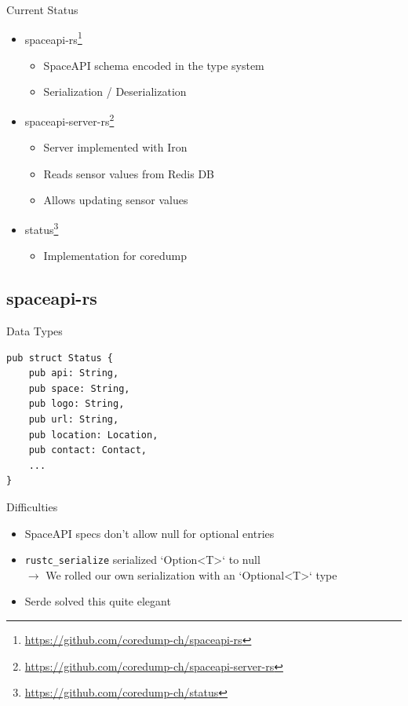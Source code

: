 \begin{frame}[c]{Current Status}
    \begin{itemize}
        \item spaceapi-rs\footnote{\url{https://github.com/coredump-ch/spaceapi-rs}}
            \begin{itemize}
                \item SpaceAPI schema encoded in the type system
                \item Serialization / Deserialization
            \end{itemize}
        \item spaceapi-server-rs\footnote{\url{https://github.com/coredump-ch/spaceapi-server-rs}}
            \begin{itemize}
                \item Server implemented with Iron
                \item Reads sensor values from Redis DB
                \item Allows updating sensor values
            \end{itemize}
        \item status\footnote{\url{https://github.com/coredump-ch/status}}
            \begin{itemize}
                \item Implementation for coredump
            \end{itemize}
    \end{itemize}
\end{frame}

\subsection{spaceapi-rs}

\begin{frame}[fragile]{Data Types}
    \begin{verbatim}
pub struct Status {
    pub api: String,
    pub space: String,
    pub logo: String,
    pub url: String,
    pub location: Location,
    pub contact: Contact,
    ...
}
    \end{verbatim}
\end{frame}

\begin{frame}[c]{Difficulties}
    \begin{itemize}
        \item SpaceAPI specs don't allow null for optional entries
        \item \texttt{rustc\_serialize} serialized `Option<T>` to null \\
            \pause$\rightarrow$ We rolled our own serialization with an `Optional<T>` type
        \item Serde solved this quite elegant
    \end{itemize}
\end{frame}

